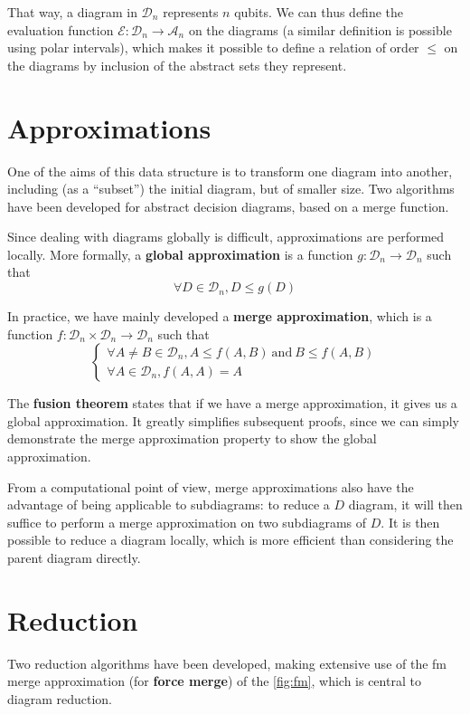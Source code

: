 That way, a diagram in $\mathcal D_n$ represents $n$ qubits.
We can thus define the evaluation function $\mathcal E : \mathcal D_n \to \mathcal A_n$ on the diagrams (a similar definition is possible using polar intervals), which makes it possible to define a relation of order $\le$ on the diagrams by inclusion of the abstract sets they represent.

\section{Approximations}

One of the aims of this data structure is to transform one diagram into another, including (as a “subset”) the initial diagram, but of smaller size. Two algorithms have been developed for abstract decision diagrams, based on a merge function.

Since dealing with diagrams globally is difficult, approximations are performed locally. More formally, a \textbf{global approximation} is a function $g : \mathcal D_n \to \mathcal D_n$ such that
$$\forall D \in \mathcal D_n, D \le g(D)$$

In practice, we have mainly developed a \textbf{merge approximation}, which is a function $f : \mathcal D_n \times \mathcal D_n \rightarrow \mathcal D_n$ such that
$$\begin{cases}
  \forall A \not= B \in \mathcal{D}_n, A \le f(A, B)~\text{and}~B \le f(A, B) \\
  \forall A \in \mathcal{D}_n, f(A, A) = A
\end{cases}
$$

The \textbf{fusion theorem} states that if we have a merge approximation, it gives us a global approximation. It greatly simplifies subsequent proofs, since we can simply demonstrate the merge approximation property to show the global approximation.

From a computational point of view, merge approximations also have the advantage of being applicable to subdiagrams: to reduce a $D$ diagram, it will then suffice to perform a merge approximation on two subdiagrams of $D$. It is then possible to reduce a diagram locally, which is more efficient than considering the parent diagram directly.

\section{Reduction}

Two reduction algorithms have been developed, making extensive use of the fm merge approximation (for \textbf{force merge}) of the \autoref{fig:fm}, which is central to diagram reduction.

